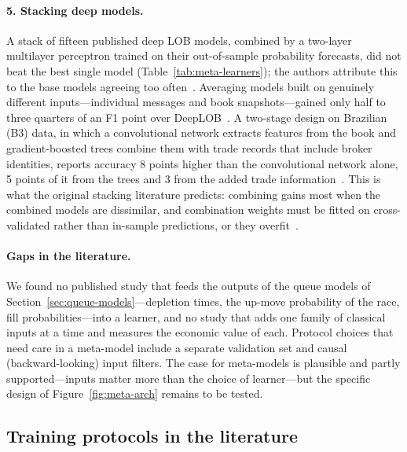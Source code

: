 \paragraph{5. Stacking deep models.} A stack of fifteen published deep LOB
models, combined by a two-layer multilayer perceptron trained on their out-of-sample probability forecasts, did not beat the
best single model (Table~\ref{tab:meta-learners}); the authors attribute this to the
base models agreeing too often~\citep{prata2024}. Averaging models built on genuinely different
inputs---individual messages and book snapshots---gained only half to three quarters of an F1 point over
DeepLOB~\citep{zhanglimzohren2021mbo}. A two-stage design on Brazilian (B3) data, in which a convolutional network extracts features from the
book and gradient-boosted trees combine them with trade records that include broker identities, reports
accuracy 8 points higher than the convolutional network alone, 5 points of it from the trees and 3 from the added
trade information~\citep{bileki2022}. This is what the original stacking literature predicts: combining
gains most when the combined models are dissimilar, and combination weights must be fitted on
cross-validated rather than in-sample predictions, or they overfit~\citep{breiman1996stack}.

\paragraph{Gaps in the literature.} We found no published study that feeds the outputs of the queue models of
Section~\ref{sec:queue-models}---depletion times, the up-move probability of the race, fill
probabilities---into a learner, and no study that adds one family of classical inputs at a time and
measures the economic value of each. Protocol choices that need care in a meta-model include a separate
validation set and causal (backward-looking) input filters. The case for meta-models is
plausible and partly supported---inputs matter more than the choice of learner---but the
specific design of Figure~\ref{fig:meta-arch} remains to be tested.

\subsection{Training protocols in the literature}
\label{sec:meta-train}

